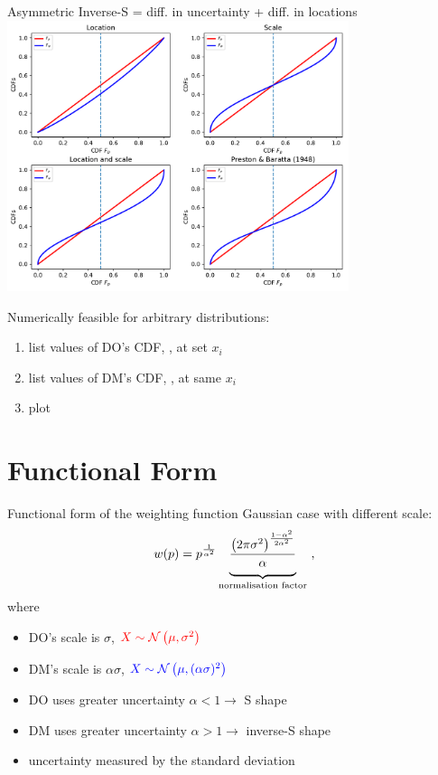 \begin{frame}{Asymmetric Inverse-S = diff. in uncertainty + diff. in locations}
\centering
	\includegraphics[width=0.75\textwidth]{../figs/Gauss_scale_location_both_KT.pdf}
	\label{LocationScale}
\end{frame}

\begin{frame}
Numerically feasible for arbitrary distributions:
\begin{enumerate}
	\item list values of DO's CDF, , at set ${x_i}$
	\item list values of DM's CDF, , at same ${x_i}$
	\item plot  \vs {}
\end{enumerate}
\end{frame}

\section{Functional Form}
\begin{frame}{Functional form of the weighting function}
Gaussian case with different scale:
\begin{equation}
	w(p) =
	p^{\frac{1}{\alpha^2}}
	\underbrace{
	\frac{\left(2\pi\sigma^2\right)^{\frac{1-\alpha^2}{2\alpha^2}}}{\alpha\strut}
	}_{\text{normalisation factor}}
	~,
\end{equation}
where
\begin{itemize}
  \item DO's scale is $\sigma$, $\textcolor{red}{X \sim \mathcal{N}\left(\mu,\sigma^2\right)}$
  \item DM's scale is $\alpha\sigma$, $\textcolor{blue}{X \sim \mathcal{N}\left(\mu,(\alpha\sigma)^2\right)}$
  \item DO uses greater uncertainty $\alpha < 1 \to$ S shape
  \item DM uses greater uncertainty $\alpha > 1 \to	$ inverse-S shape
  \item uncertainty measured by the standard deviation
\end{itemize}
\end{frame}

